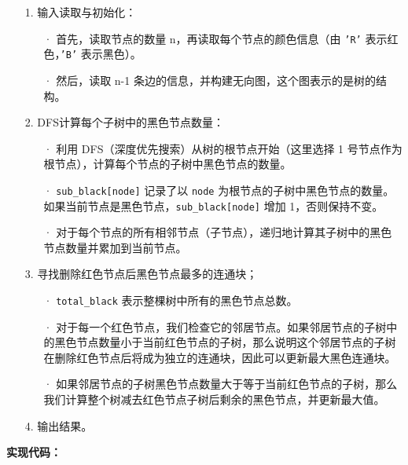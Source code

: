 \documentclass[a4paper]{ctexart}
\begin{document}
\begin{itemize}
	\item[1.] 输入读取与初始化：
		\begin{itemize}
			\item[·] 首先，读取节点的数量 n，再读取每个节点的颜色信息（由 \texttt{'R'} 表示红色，\texttt{'B'} 表示黑色）。
			\item[·] 然后，读取 n-1 条边的信息，并构建无向图，这个图表示的是树的结构。
		\end{itemize}
	
	\item[2.] DFS计算每个子树中的黑色节点数量：
		\begin{itemize}
			\item[·] 利用 DFS（深度优先搜索）从树的根节点开始（这里选择 1 号节点作为根节点），计算每个节点的子树中黑色节点的数量。
			\item[·] \texttt{sub\_black[node]} 记录了以 \texttt{node} 为根节点的子树中黑色节点的数量。如果当前节点是黑色节点，\texttt{sub\_black[node]} 增加 1，否则保持不变。
			\item[·] 对于每个节点的所有相邻节点（子节点），递归地计算其子树中的黑色节点数量并累加到当前节点。
		\end{itemize}
	
	\item[3.] 寻找删除红色节点后黑色节点最多的连通块；
		\begin{itemize}
			\item[·] \texttt{total\_black} 表示整棵树中所有的黑色节点总数。
			\item[·] 对于每一个红色节点，我们检查它的邻居节点。如果邻居节点的子树中的黑色节点数量小于当前红色节点的子树，那么说明这个邻居节点的子树在删除红色节点后将成为独立的连通块，因此可以更新最大黑色连通块。
			\item[·] 如果邻居节点的子树黑色节点数量大于等于当前红色节点的子树，那么我们计算整个树减去红色节点子树后剩余的黑色节点，并更新最大值。
		\end{itemize}
		
	\item[4.] 输出结果。
\end{itemize}

\noindent\textbf{实现代码：}
\end{document}
